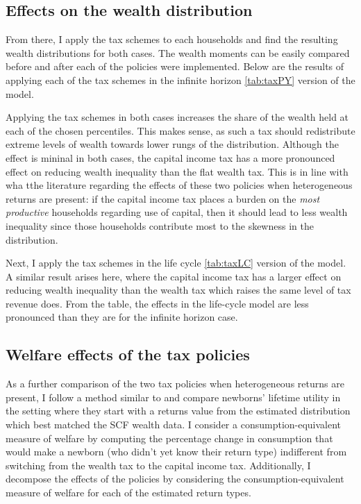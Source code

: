 \subsection{Effects on the wealth distribution}

\par From there, I apply the tax schemes to each households and find the resulting wealth distributions for both cases. The wealth moments can be easily compared before and after each of the policies were implemented. Below are the results of applying each of the tax schemes in the infinite horizon \ref{tab:taxPY} version of the model. 
\unskip

\par Applying the tax schemes in both cases increases the share of the wealth held at each of the chosen percentiles. This makes sense, as such a tax should redistribute extreme levels of wealth towards lower rungs of the distribution. Although the effect is mininal in both cases, the capital income tax has a more pronounced effect on reducing wealth inequality than the flat wealth tax. This is in line with wha tthe literature regarding the effects of these two policies when heterogeneous returns are present: if the capital income tax places a burden on the \textit{most productive} households regarding use of capital, then it should lead to less wealth inequality since those households contribute most to the skewness in the distribution.

\par Next, I apply the tax schemes in the life cycle \ref{tab:taxLC} version of the model. A similar result arises here, where the capital income tax has a larger effect on reducing wealth inequality than the wealth tax which raises the same level of tax revenue does. From the table, the effects in the life-cycle model are less pronounced than they are for the infinite horizon case. 

\unskip

\subsection{Welfare effects of the tax policies}

\par As a further comparison of the two tax policies when heterogeneous returns are present, I follow a method similar to \cite{Guvenen2023} and compare newborns' lifetime utility in the setting where they start with a returns value from the estimated distribution which best matched the SCF wealth data. I consider a consumption-equivalent measure of welfare by computing the percentage change in consumption that would make a newborn (who didn't yet know their return type) indifferent from switching from the wealth tax to the capital income tax. Additionally, I decompose the effects of the policies by considering the consumption-equivalent measure of welfare for each of the estimated return types.

